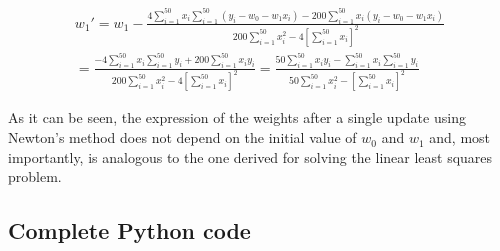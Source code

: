 \documentclass[letterpaper,headings=standardclasses]{scrartcl}
\begin{document}
\begin{multline*}
w_1' = w_1 - \frac{4 \sum_{i = 1}^{50} x_i \sum_{i = 1}^{50} (y_i - w_0 - w_1 x_i) - 200 \sum_{i = 1}^{50} x_i(y_i - w_0 - w_1 x_i)}{200 \sum_{i = 1}^{50} x_i^2 - 4 \left[ \sum_{i = 1}^{50} x_i \right]^2} \\
= \frac{-4 \sum_{i = 1}^{50} x_i \sum_{i = 1}^{50} y_i + 200 \sum_{i = 1}^{50} x_i y_i}{200 \sum_{i = 1}^{50} x_i^2 - 4 \left[ \sum_{i = 1}^{50} x_i \right]^2} = \frac{50 \sum_{i = 1}^{50} x_i y_i - \sum_{i = 1}^{50} x_i \sum_{i = 1}^{50} y_i}{50 \sum_{i = 1}^{50} x_i^2 - \left[ \sum_{i = 1}^{50} x_i \right]^2}
\end{multline*}

As it can be seen, the expression of the weights after a single update using Newton's method does not depend on the initial value of $w_0$ and $w_1$ and, most importantly, is analogous to the one derived for solving the linear least squares problem.

\subsection{Complete Python code}


\end{document}
